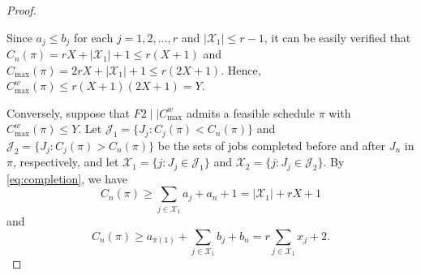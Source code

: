 ﻿\documentclass[12pt]{article} \textheight=24.5cm \textwidth=16.5cm \parskip = 0.165cm
\renewcommand{\thefigure}{\arabic{figure}}
\begin{document}
\begin{sloppypar}
\begin{proof}
\begin{figure}[H]
                \label{fig:nphard-partition}
            \end{figure}

        Since $a_j \leq b_j$ for each $j=1, 2, \ldots, r$ and $|\mathcal{X}_1| \leq r-1$, it can be easily verified that $C_n(\pi)=rX +|\mathcal{X}_1|+1 \leq r(X+1)$ and $C_{\max}(\pi)=2rX+|\mathcal{X}_1|+1 \leq r(2X+1)$.
        Hence, $C_{\max}^w(\pi) \leq r(X+1)(2X+1)= Y$.

        Conversely, suppose that $F2 \mid \mid C_{\max}^w$ admits a feasible schedule $\pi$ with $C_{\max}^w(\pi) \leq Y$.
        Let $\mathcal{J}_1=\{J_j: C_j(\pi) <C_n(\pi)\}$ and $\mathcal{J}_2=\{J_j: C_j(\pi) > C_n(\pi)\}$ be the sets of jobs completed before and after $J_n$ in $\pi$, respectively, and let $\mathcal{X}_1=\{j: J_j \in \mathcal{J}_1\}$ and $\mathcal{X}_2=\{j: J_j \in \mathcal{J}_2\}$.
        By \cref{eq:completion}, we have
            \begin{equation}\label{eq:completetime1}
                C_n(\pi) \geq \sum_{j \in \mathcal{X}_1} a_j +a_n+ 1=|\mathcal{X}_1| +r X + 1
            \end{equation}
        and
            \begin{equation}\label{eq:completetime2}
                C_n(\pi) \geq a_{\pi(1)}+\sum_{j \in \mathcal{X}_1} b_j+b_n = r \sum_{j \in \mathcal{X}_1} x_j + 2.
            \end{equation}


\end{proof}
\end{sloppypar}
\end{document}
